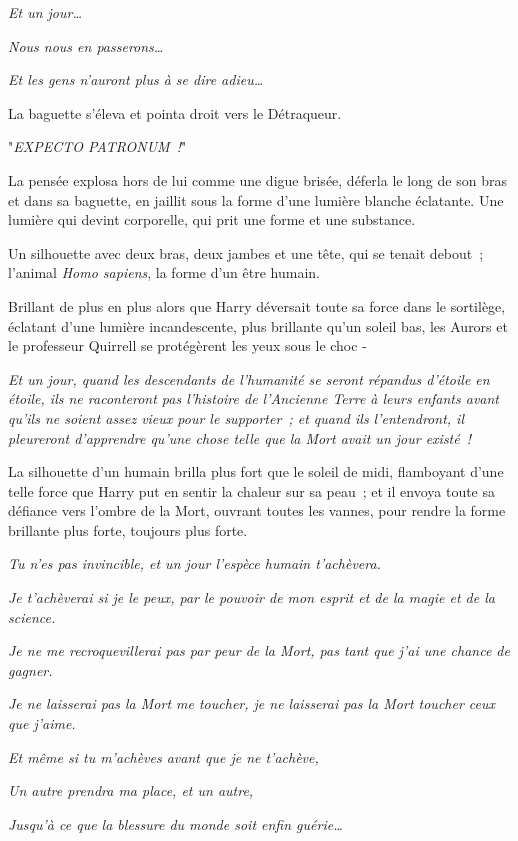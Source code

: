 \emph{Et un jour…}

\emph{Nous nous en passerons…}

\emph{Et les gens n'auront plus à se dire adieu…}

La baguette s'éleva et pointa droit vers le Détraqueur.

"\emph{EXPECTO PATRONUM~!}"

La pensée explosa hors de lui comme une digue brisée, déferla le long de son bras et dans sa baguette, en jaillit sous la forme d'une lumière blanche éclatante. Une lumière qui devint corporelle, qui prit une forme et une substance.

Un silhouette avec deux bras, deux jambes et une tête, qui se tenait debout~; l'animal \emph{Homo sapiens}, la forme d'un être humain.

Brillant de plus en plus alors que Harry déversait toute sa force dans le sortilège, éclatant d'une lumière incandescente, plus brillante qu'un soleil bas, les Aurors et le professeur Quirrell se protégèrent les yeux sous le choc -

\emph{Et un jour, quand les descendants de l'humanité se seront répandus d'étoile en étoile, ils ne raconteront pas l'histoire de l'Ancienne Terre à leurs enfants avant qu'ils ne soient assez vieux pour le supporter~; et quand ils l'entendront, il pleureront d'apprendre qu'une chose telle que la Mort avait un jour existé~!}

La silhouette d'un humain brilla plus fort que le soleil de midi, flamboyant d'une telle force que Harry put en sentir la chaleur sur sa peau~; et il envoya toute sa défiance vers l'ombre de la Mort, ouvrant toutes les vannes, pour rendre la forme brillante plus forte, toujours plus forte.

\emph{Tu n'es pas invincible, et un jour l'espèce humain t'achèvera.}

\emph{Je t'achèverai si je le peux, par le pouvoir de mon esprit et de la magie et de la science.}

\emph{Je ne me recroquevillerai pas par peur de la Mort, pas tant que j'ai une chance de gagner.}

\emph{Je ne laisserai pas la Mort me toucher, je ne laisserai pas la Mort toucher ceux que j'aime.}

\emph{Et même si tu m'achèves avant que je ne t'achève,}

\emph{Un autre prendra ma place, et un autre,}

\emph{Jusqu'à ce que la blessure du monde soit enfin guérie…}

